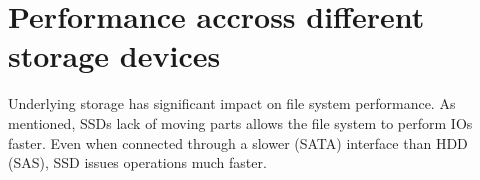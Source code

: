 \documentclass[
  color, %
  table, %
  lof,   %
  lot,   %
]{fithesis3}
\begin{document}

\section{Performance accross different storage devices}
Underlying storage has significant impact on file system performance. As mentioned, SSDs lack of moving parts allows the file system to perform IOs faster. Even when connected through a slower (SATA) interface than HDD (SAS), SSD issues operations much faster.







\end{document}
